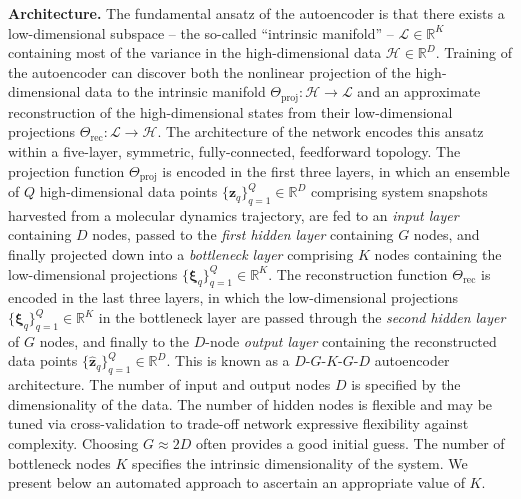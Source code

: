\documentclass[12pt]{article}
\begin{document}
\textbf{Architecture.} The fundamental ansatz of the autoencoder is that there exists a low-dimensional subspace -- the so-called ``intrinsic manifold'' \cite{ferguson2010systematic} -- $\mathcal{L} \in \mathbb{R}^K$ containing most of the variance in the high-dimensional data $\mathcal{H} \in \mathbb{R}^D$. Training of the autoencoder can discover both the nonlinear projection of the high-dimensional data to the intrinsic manifold $\Theta_\mathrm{proj} : \mathcal{H} \rightarrow \mathcal{L}$ and an approximate reconstruction of the high-dimensional states from their low-dimensional projections $\Theta_\mathrm{rec} : \mathcal{L} \rightarrow \mathcal{H}$\cite{scholz2008nonlinear,bourlard1988auto}. The architecture of the network encodes this ansatz within a five-layer, symmetric, fully-connected, feedforward topology. The projection function $\Theta_\mathrm{proj}$ is encoded in the first three layers, in which an ensemble of $Q$ high-dimensional data points $\{\mathbf{z}_q\}_{q=1}^Q \in \mathbb{R}^D$ comprising system snapshots harvested from a molecular dynamics trajectory, are fed to an \textit{input layer} containing $D$ nodes, passed to the \textit{first hidden layer} containing $G$ nodes, and finally projected down into a \textit{bottleneck layer} comprising $K$ nodes containing the low-dimensional projections $\{\boldsymbol\xi_q\}_{q=1}^Q \in \mathbb{R}^K$. The reconstruction function $\Theta_\mathrm{rec}$ is encoded in the last three layers, in which the low-dimensional projections $\{\boldsymbol\xi_q\}_{q=1}^Q \in \mathbb{R}^K$ in the bottleneck layer are passed through the \textit{second hidden layer} of $G$ nodes, and finally to the $D$-node \textit{output layer} containing the reconstructed data points $\{\hat{\mathbf{z}}_q\}_{q=1}^Q \in \mathbb{R}^D$. This is known as a $D$-$G$-$K$-$G$-$D$ autoencoder architecture. The number of input and output nodes $D$ is specified by the dimensionality of the data. The number of hidden nodes is flexible and may be tuned via cross-validation to trade-off network expressive flexibility against complexity. Choosing $G \approx 2D$ often provides a good initial guess. The number of bottleneck nodes $K$ specifies the intrinsic dimensionality of the system. We present below an automated approach to ascertain an appropriate value of $K$.
\end{document}

